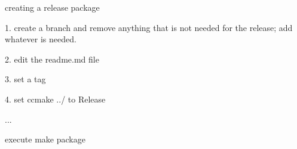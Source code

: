 

creating a release package

1. create a branch and remove anything that is not needed for the release; add whatever is needed.

2. edit the readme.md file

3. set a tag

4. set ccmake ../ to Release 

...

execute make package 